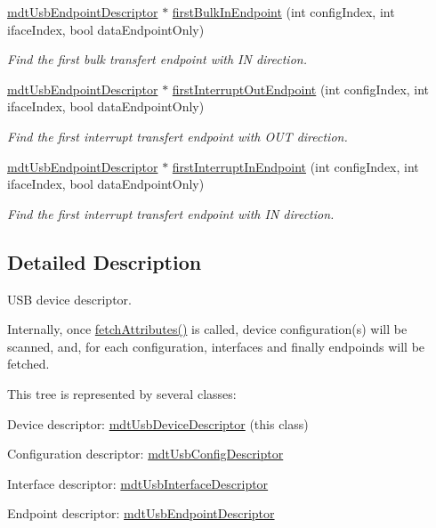 \begin{DoxyCompactItemize}
\hyperlink{classmdt_usb_endpoint_descriptor}{mdtUsbEndpointDescriptor} $\ast$ \hyperlink{classmdt_usb_device_descriptor_a078b5d3dfe6fd56ab2f716357a160585}{firstBulkInEndpoint} (int configIndex, int ifaceIndex, bool dataEndpointOnly)
\begin{DoxyCompactList}\small\item\em Find the first bulk transfert endpoint with IN direction. \end{DoxyCompactList}\item 
\hyperlink{classmdt_usb_endpoint_descriptor}{mdtUsbEndpointDescriptor} $\ast$ \hyperlink{classmdt_usb_device_descriptor_ad30b3579b0c77585df29acdfdf0fc179}{firstInterruptOutEndpoint} (int configIndex, int ifaceIndex, bool dataEndpointOnly)
\begin{DoxyCompactList}\small\item\em Find the first interrupt transfert endpoint with OUT direction. \end{DoxyCompactList}\item 
\hyperlink{classmdt_usb_endpoint_descriptor}{mdtUsbEndpointDescriptor} $\ast$ \hyperlink{classmdt_usb_device_descriptor_a95112e151605bf8b10c5eca74faaea3b}{firstInterruptInEndpoint} (int configIndex, int ifaceIndex, bool dataEndpointOnly)
\begin{DoxyCompactList}\small\item\em Find the first interrupt transfert endpoint with IN direction. \end{DoxyCompactList}\end{DoxyCompactItemize}


\subsection{Detailed Description}
USB device descriptor. 

Internally, once \hyperlink{classmdt_usb_device_descriptor_a6239e5e56e2e25a686cac98b18158500}{fetchAttributes()} is called, device configuration(s) will be scanned, and, for each configuration, interfaces and finally endpoinds will be fetched.

This tree is represented by several classes:
\begin{DoxyItemize}
\item Device descriptor: \hyperlink{classmdt_usb_device_descriptor}{mdtUsbDeviceDescriptor} (this class)
\item Configuration descriptor: \hyperlink{classmdt_usb_config_descriptor}{mdtUsbConfigDescriptor}
\item Interface descriptor: \hyperlink{classmdt_usb_interface_descriptor}{mdtUsbInterfaceDescriptor}
\item Endpoint descriptor: \hyperlink{classmdt_usb_endpoint_descriptor}{mdtUsbEndpointDescriptor}
\end{DoxyItemize}


